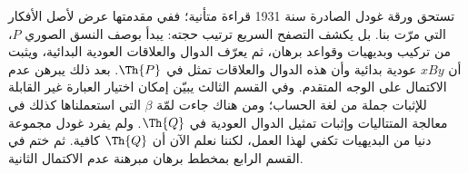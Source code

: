 \documentclass[../../../include/open-logic-section]{subfiles}
\begin{document}


تستحق ورقة غودل الصادرة سنة 1931 قراءة متأنية؛ ففي مقدمتها عرض
لأصل الأفكار التي مرّت بنا. بل يكشف التصفح السريع ترتيب حجته:
يبدأ بوصف النسق الصوري $P$، من تركيب وبديهيات وقواعد برهان،
ثم يعرّف الدوال والعلاقات العودية البدائية، ويثبت أن $x B y$
عودية بدائية وأن هذه الدوال والعلاقات تمثل في $\Th{P}$.
بعد ذلك يبرهن عدم الاكتمال على الوجه المتقدم. وفي القسم الثالث
يبيّن إمكان اختيار العبارة غير القابلة للإثبات جملة من لغة الحساب؛
ومن هناك جاءت لمّة $\beta$ التي استعملناها كذلك في معالجة
المتتاليات وإثبات تمثيل الدوال العودية في $\Th{Q}$.
ولم يفرد غودل مجموعة دنيا من البديهيات تكفي لهذا العمل، لكننا
نعلم الآن أن $\Th{Q}$ كافية. ثم ختم في القسم الرابع بمخطط
برهان مبرهنة عدم الاكتمال الثانية.
\end{document}

